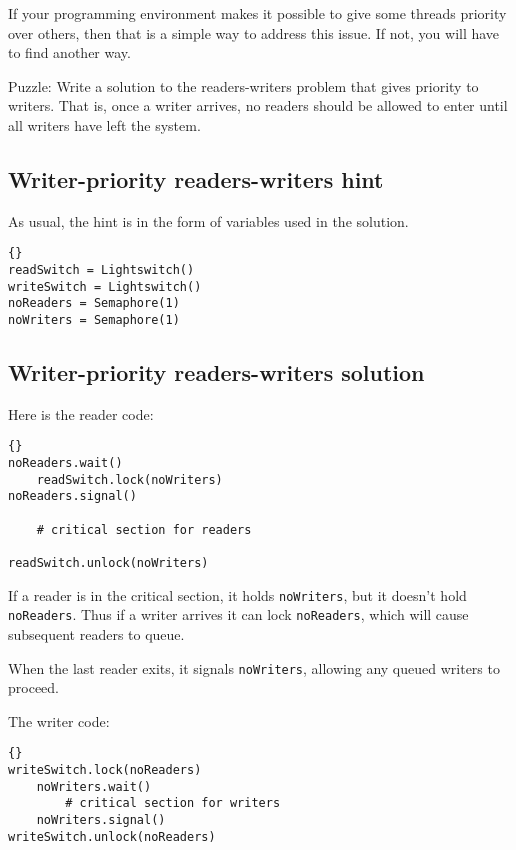 \documentclass{book}
\newcommand{\clearemptydoublepage}{\newpage\cleardoublepage}
\begin{document}
If your programming environment makes it possible to give
some threads priority over others, then that is a simple way
to address this issue.  If not, you will have to find another
way.

Puzzle: Write a solution to the readers-writers problem that gives
priority to writers.  That is, once a writer arrives, no readers
should be allowed to enter until all writers have left the system.


\clearemptydoublepage
\subsection{Writer-priority readers-writers hint}

As usual, the hint is in the form of variables
used in the solution.

\begin{lstlisting}[title={Writer-priority readers-writers initialization}]{}
readSwitch = Lightswitch()
writeSwitch = Lightswitch()
noReaders = Semaphore(1)
noWriters = Semaphore(1)
\end{lstlisting}


\clearemptydoublepage
\subsection{Writer-priority readers-writers solution}

Here is the reader code:

\begin{lstlisting}[title={Writer-priority reader solution}]{}
noReaders.wait()
    readSwitch.lock(noWriters)
noReaders.signal()

    # critical section for readers

readSwitch.unlock(noWriters)
\end{lstlisting}

If a reader is in the critical section, it holds
{\tt noWriters}, but it doesn't hold {\tt noReaders}.
Thus if a writer arrives it can lock {\tt noReaders},
which will cause subsequent readers to queue.

When the last reader exits, it signals {\tt noWriters},
allowing any queued writers to proceed.

The writer code:

\begin{lstlisting}[title={Writer-priority writer solution}]{}
writeSwitch.lock(noReaders)
    noWriters.wait()
        # critical section for writers
    noWriters.signal()
writeSwitch.unlock(noReaders)
\end{lstlisting}
\end{document}

